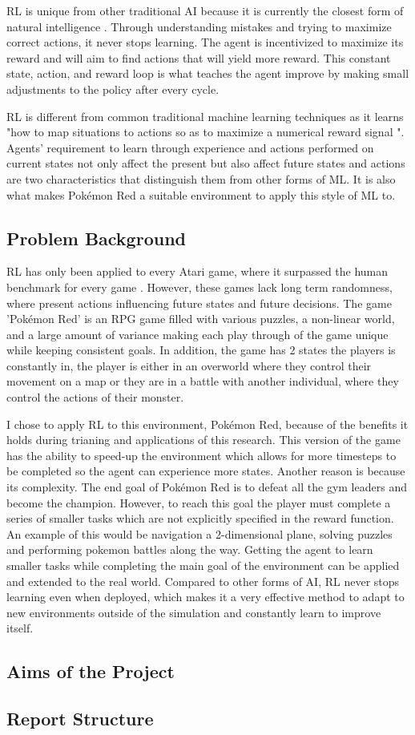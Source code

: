 RL is unique from other traditional AI because it is currently the closest form of natural intelligence \cite{Sutton1}. Through understanding mistakes and trying to maximize correct actions, it never stops learning. The agent is incentivized to maximize its reward and will aim to find actions that will yield more reward. This constant state, action, and reward loop is what teaches the agent improve by making small adjustments to the policy after every cycle. 

RL is different from common traditional machine learning techniques as it learns "how to map situations to actions so as to maximize a numerical reward signal \cite{Sutton1}". Agents' requirement to learn through experience and actions performed on current states not only affect the present but also affect future states and actions are two characteristics that distinguish them from other forms of ML. It is also what makes Pokémon Red a suitable environment to apply this style of ML to.

\subsection{Problem Background}

RL has only been applied to every Atari game, where it surpassed the human benchmark for every game \cite{brockman2016openai}. 
However, these games lack long term randomness, where present actions influencing future states and future decisions. The game 'Pokémon Red' is an RPG game filled with various puzzles, a non-linear world, and a large amount of variance making each play through of the game unique while keeping consistent goals. In addition, the game has 2 states the players is constantly in, the player is either in an 
overworld where they control their movement on a map or they are in a battle with another individual, where they control the actions 
of their monster.

I chose to apply RL to this environment, Pokémon Red, because of the benefits it holds during trianing and applications of this 
research. This version of the game has the ability to speed-up the environment which allows for more timesteps to be completed 
so the agent can experience more states. Another reason is because its complexity. The end goal of Pokémon Red is to defeat all the 
gym leaders and become the champion. However, to reach this goal the player must complete a series of smaller tasks which are not 
explicitly specified in the reward function. An example of this would be navigation a 2-dimensional plane, solving puzzles and
 performing pokemon battles along the way. Getting the agent to learn smaller tasks while completing the main goal of the environment 
 can be applied and extended to the real world. Compared to other forms of AI, RL never stops learning even when deployed, which makes
 it a very effective method to adapt to new environments outside of the simulation and constantly learn to improve itself. 

\subsection{Aims of the Project}
\subsection{Report Structure}
